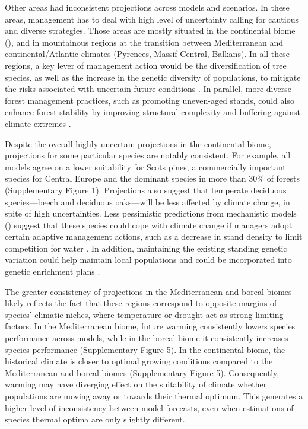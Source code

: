\documentclass[11pt,letter]{article}
\begin{document}
Other areas had inconsistent projections across models and scenarios. In these areas, management has to deal with high level of uncertainty calling for cautious and diverse strategies. Those areas are mostly situated in the continental biome (), and in mountainous regions at the transition between Mediterranean and continental/Atlantic climates (Pyrenees, Massif Central, Balkans). In all these regions, a key lever of management action would be the diversification of tree species, as well as the increase in the genetic diversity of populations, to mitigate the risks associated with uncertain future conditions \citep{Morin2014, Ammer2019, Pretzsch2021, Vospernik2024}. In parallel, more diverse forest management practices, such as promoting uneven-aged stands, could also enhance forest stability by improving structural complexity and buffering against climate extremes \citep{Vangi2024, Zhang2024a}.

Despite the overall highly uncertain projections in the continental biome, projections for some particular species are notably consistent. For example, all models agree on a lower suitability for Scots pines, a commercially important species for Central Europe and the dominant species in more than 30\% of forests (Supplementary Figure 1). Projections also suggest that temperate deciduous species---beech and deciduous oaks---will be less affected by climate change, in spite of high uncertainties. Less pessimistic predictions from mechanistic models () suggest that these species could cope with climate change if managers adopt certain adaptive management actions, such as a decrease in stand density to limit competition for water \citep{Young2023}. In addition, maintaining the existing standing genetic variation could help maintain local populations and could be incorporated into genetic enrichment plans \citep{Brang2014}. 

The greater consistency of projections in the Mediterranean and boreal biomes likely reflects the fact that these regions correspond to opposite margins of species' climatic niches, where temperature or drought act as strong limiting factors. In the Mediterranean biome, future warming consistently lowers species performance across models, while in the boreal biome it consistently increases species performance (Supplementary Figure 5). In the continental biome, the historical climate is closer to optimal growing conditions compared to the Mediterranean and boreal biomes (Supplementary Figure 5). Consequently, warming may have diverging effect on the suitability of climate whether populations are moving away or towards their thermal optimum. This generates a higher level of inconsistency between model forecasts, even when estimations of species thermal optima are only slightly different.
\end{document}
